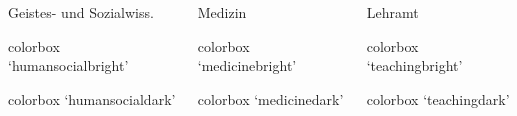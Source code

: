 \documentclass[german,notoc]{tudbeamer}%
\begin{document}
\begin{frame}
\begin{columns}
\begin{column}{.33\textwidth}
			Geistes- und Sozialwiss.
			\begin{beamercolorbox}[wd=0.9\textwidth,sep=1em]{colorbox}
				\centering `humansocialbright'
		    \end{beamercolorbox}
			\begin{beamercolorbox}[wd=0.9\textwidth,sep=1em]{colorbox}
				\centering `humansocialdark'
		    \end{beamercolorbox}
		\end{column}
		\hspace{-.1\textwidth}\begin{column}{.33\textwidth}
			Medizin
			\begin{beamercolorbox}[wd=0.9\textwidth,sep=1em]{colorbox}
				\centering `medicinebright'
		    \end{beamercolorbox}
			\begin{beamercolorbox}[wd=0.9\textwidth,sep=1em]{colorbox}
				\centering `medicinedark'
		    \end{beamercolorbox}
		\end{column}
		\hspace{-.1\textwidth}\begin{column}{.33\textwidth}
			Lehramt
			\begin{beamercolorbox}[wd=0.9\textwidth,sep=1em]{colorbox}
				\centering `teachingbright'
		    \end{beamercolorbox}
			\begin{beamercolorbox}[wd=0.9\textwidth,sep=1em]{colorbox}
				\centering `teachingdark'
		    \end{beamercolorbox}
		\end{column}
	\end{columns}


\end{frame}
\end{document}
